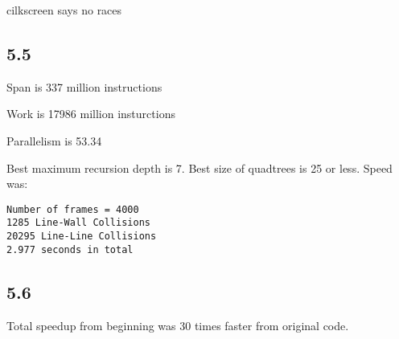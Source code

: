 \documentclass[12pt]{article}
\begin{document}
cilkscreen says no races
\subsection{5.5}
Span is 337 million instructions

Work is 17986 million insturctions

Parallelism is 53.34

Best maximum recursion depth is 7.  Best size of quadtrees is 25 or less.  Speed
was:
\begin{verbatim}
Number of frames = 4000
1285 Line-Wall Collisions
20295 Line-Line Collisions
2.977 seconds in total
\end{verbatim}


\subsection{5.6}
Total speedup from beginning was 30 times faster from original code.  
\end{document}
